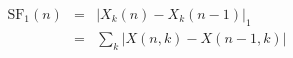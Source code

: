 \documentclass{article}
\begin{document}
 
\begin{eqnarray*}
\mbox{SF}_1(n) & = & \left| X_k(n) - X_k(n-1) \right|_1 \\
   & =  & \sum_k |X(n,k) - X(n-1,k)|
\end{eqnarray*}
 \newpage 
\end{document}
